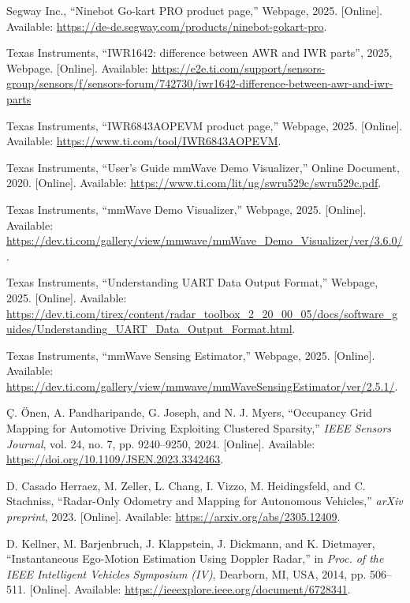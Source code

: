 
\begin{thebibliography}{00}

Segway Inc., ``Ninebot Go-kart PRO product page,'' Webpage, 2025. 
[Online]. Available: \url{https://de-de.segway.com/products/ninebot-gokart-pro}. 

Texas Instruments, ``IWR1642: difference between AWR and IWR parts'', 2025, Webpage. 
[Online]. Available: \url{https://e2e.ti.com/support/sensors-group/sensors/f/sensors-forum/742730/iwr1642-difference-between-awr-and-iwr-parts}

Texas Instruments, ``IWR6843AOPEVM product page,'' Webpage, 2025. 
[Online]. Available: \url{https://www.ti.com/tool/IWR6843AOPEVM}. 

Texas Instruments, ``User's Guide mmWave Demo Visualizer,'' Online Document, 2020. 
[Online]. Available: \url{https://www.ti.com/lit/ug/swru529c/swru529c.pdf}. 

Texas Instruments, ``mmWave Demo Visualizer,'' Webpage, 2025. 
[Online]. Available: \url{https://dev.ti.com/gallery/view/mmwave/mmWave_Demo_Visualizer/ver/3.6.0/}. 

Texas Instruments, ``Understanding UART Data Output Format,'' Webpage, 2025. 
[Online]. Available: \url{https://dev.ti.com/tirex/content/radar_toolbox_2_20_00_05/docs/software_guides/Understanding_UART_Data_Output_Format.html}. 

Texas Instruments, ``mmWave Sensing Estimator,'' Webpage, 2025. 
[Online]. Available: \url{https://dev.ti.com/gallery/view/mmwave/mmWaveSensingEstimator/ver/2.5.1/}. 

Ç. Önen, A. Pandharipande, G. Joseph, and N. J. Myers, 
``Occupancy Grid Mapping for Automotive Driving Exploiting Clustered Sparsity,'' 
\textit{IEEE Sensors Journal}, vol. 24, no. 7, pp. 9240–9250, 2024. 
[Online]. Available: \url{https://doi.org/10.1109/JSEN.2023.3342463}. 

D. Casado Herraez, M. Zeller, L. Chang, I. Vizzo, M. Heidingsfeld, and C. Stachniss, 
``Radar-Only Odometry and Mapping for Autonomous Vehicles,'' 
\textit{arXiv preprint}, 2023. 
[Online]. Available: \url{https://arxiv.org/abs/2305.12409}. 

D. Kellner, M. Barjenbruch, J. Klappstein, J. Dickmann, and K. Dietmayer,  
``Instantaneous Ego-Motion Estimation Using Doppler Radar,''  
in \textit{Proc. of the IEEE Intelligent Vehicles Symposium (IV)},  
Dearborn, MI, USA, 2014, pp. 506–511.  
[Online]. Available: \url{https://ieeexplore.ieee.org/document/6728341}. 


\end{thebibliography}
